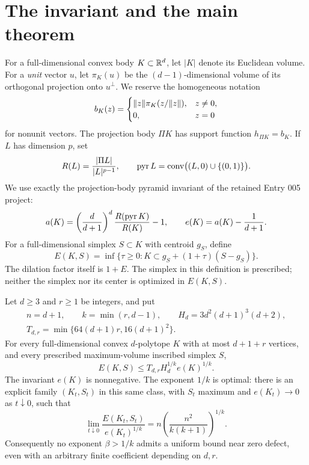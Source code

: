 \section{The invariant and the main theorem}
\label{sec:main}
For a full-dimensional convex body $K\subset\mathbb R^d$, let $|K|$ denote its
Euclidean volume. For a \emph{unit} vector $u$, let $\pi_K(u)$ be the
$(d-1)$-dimensional volume of its orthogonal projection onto $u^\perp$.
We reserve the homogeneous notation
\[
 b_K(z)=\begin{cases}\lVert z\rVert\pi_K(z/\lVert z\rVert),&z\ne0,\\0,&z=0\end{cases}
\]
for nonunit vectors. The projection body $\Pi K$ has support function
$h_{\Pi K}=b_K$. If $L$ has dimension $p$, set
\[
 R(L)=\frac{|\Pi L|}{|L|^{p-1}},\qquad
 \operatorname{pyr} L=\operatorname{conv}\bigl((L,0)\cup\{(0,1)\}\bigr).
\]
We use exactly the projection-body pyramid invariant of the retained
Entry 005 project:
\begin{equation}\label{eq:actualdefect}
 a(K)=\left(\frac d{d+1}\right)^d
       \frac{R(\operatorname{pyr} K)}{R(K)}-1,
 \qquad e(K)=a(K)-\frac1{d+1}.
\end{equation}
For a full-dimensional simplex $S\subset K$ with centroid $g_S$, define
\begin{equation}\label{eq:excess}
 E(K,S)=\inf\{\tau\ge0:K\subset g_S+(1+\tau)(S-g_S)\}.
\end{equation}
The dilation factor itself is $1+E$. The simplex in this definition is
prescribed; neither the simplex nor its center is optimized in $E(K,S)$.

\begin{theorem}\label{thm:main}
Let $d\ge3$ and $r\ge1$ be integers, and put
\[
 \begin{gathered}
 n=d+1,\qquad k=\min(r,d-1),\qquad H_d=3d^2(d+1)^3(d+2),\\
 T_{d,r}=\min\{64(d+1)r,16(d+1)^2\}.
 \end{gathered}
\]
For every full-dimensional convex $d$-polytope $K$ with at most $d+1+r$
vertices, and every prescribed maximum-volume inscribed simplex $S$,
\begin{equation}\label{eq:main}
 E(K,S)\le T_{d,r}H_d^{1/k}e(K)^{1/k}.
\end{equation}
The invariant $e(K)$ is nonnegative. The exponent $1/k$ is optimal:
there is an explicit family $(K_t,S_t)$ in this same class, with $S_t$
maximum and $e(K_t)\to0$ as $t\downarrow0$, such that
\begin{equation}\label{eq:sharp_limit}
 \lim_{t\downarrow0}\frac{E(K_t,S_t)}{e(K_t)^{1/k}}
 =n\left(\frac{n^2}{k(k+1)}\right)^{1/k}.
\end{equation}
Consequently no exponent $\beta>1/k$ admits a uniform bound near zero
defect, even with an arbitrary finite coefficient depending on $d,r$.
\end{theorem}

